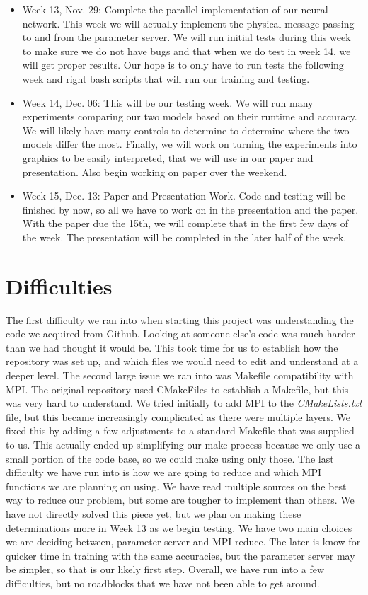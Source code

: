 \documentclass[11pt]{article}
\begin{document}
\begin{itemize}
\item Week 13, Nov. 29: Complete the parallel implementation of our neural network. This week we will actually implement the physical message passing to and from the parameter server. We will run initial tests during this week to make sure we do not have bugs and that when we do test in week 14, we will get proper results. Our hope is to only have to run tests the following week and right bash scripts that will run our training and testing.
\item Week 14, Dec. 06: This will be our testing week. We will run many experiments comparing our two models based on their runtime and accuracy. We will likely have many controls to determine to determine where the two models differ the most. Finally, we will work on turning the experiments into graphics to be easily interpreted, that we will use in our paper and presentation. Also begin working on paper over the weekend.
\item Week 15, Dec. 13: Paper and Presentation Work. Code and testing will be finished by now, so all we have to work on in the presentation and the paper. With the paper due the 15th, we will complete that in the first few days of the week. The presentation will be completed in the later half of the week.
\end{itemize}


\section {Difficulties}

The first difficulty we ran into when starting this project was understanding the code we acquired from Github. Looking at someone else's code was much harder than we had thought it would be. This took time for us to establish how the repository was set up, and which files we would need to edit and understand at a deeper level. The second large issue we ran into was Makefile compatibility with MPI. The original repository used CMakeFiles to establish a Makefile, but this was very hard to understand. We tried initially to add MPI to the \textit{CMakeLists.txt} file, but this became increasingly complicated as there were multiple layers. We fixed this by adding a few adjustments to a standard Makefile that was supplied to us. This actually ended up simplifying our make process because we only use a small portion of the code base, so we could make using only those. The last difficulty we have run into is how we are going to reduce and which MPI functions we are planning on using. We have read multiple sources on the best way to reduce our problem, but some are tougher to implement than others. We have not directly solved this piece yet, but we plan on making these determinations more in Week 13 as we begin testing. We have two main choices we are deciding between, parameter server and MPI reduce. The later is know for quicker time in training with the same accuracies\cite{iandola2016firecaffe}, but the parameter server may be simpler, so that is our likely first step. Overall, we have run into a few difficulties, but no roadblocks that we have not been able to get around.




\end{document}
